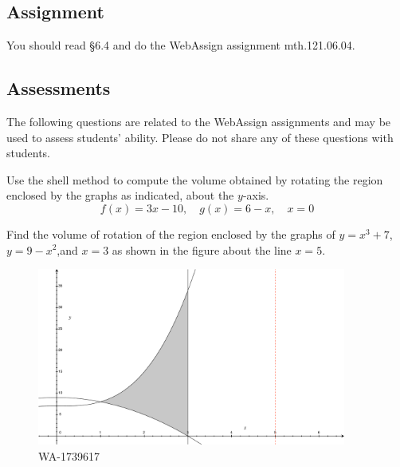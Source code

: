 \documentclass[12pt,addpoints, answers, fleqn]{exam}
\begin{document}
\subsection{Assignment}
You should read \S  6.4 and do the WebAssign assignment mth.121.06.04.
\vfill
\pagebreak
\begin{teacher}
\subsection{Assessments}
The following questions are related to the WebAssign assignments and may be used to assess students' ability. Please do not share any of these questions with students.
\begin{questions}	
\question 	%

Use the shell method to compute the volume obtained by rotating the region enclosed by the graphs as indicated, about the $y$-axis.
\[
f\left(x\right) = 3x - 10, \quad g\left(x\right) = 6 - x, \quad x = 0
\]

\begin{solution}
\end{solution}


\question 	%

Find the volume of rotation of the region enclosed by the graphs of $y = x^3 + 7$, $y = 9 - x^2$,and $x = 3$ as shown in the figure about the line $x = 5$.

\begin{figure}[htbp] %
   \centering
   \includegraphics[width=4in]{./graphics/1739617.pdf} 
   \caption{WA-1739617}
   \label{fig:1739617}
\end{figure}
 \begin{solution}
\end{solution}


\end{questions}
\end{teacher}
\end{document}
